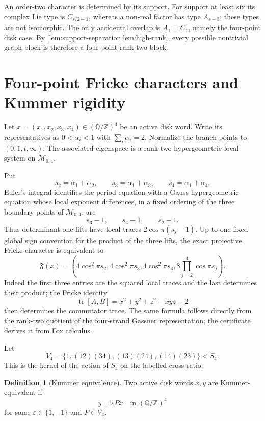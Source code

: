 \documentclass[11pt]{article}
\theoremstyle{definition}
\newtheorem{definition}[theorem]{Definition}
\theoremstyle{remark}
\newcommand{\Q}{\mathbb Q}
\newcommand{\Z}{\mathbb Z}
\newcommand{\M}{\mathcal M}
\begin{document}
An order-two character is determined by its support.  For support at least six its complex Lie type is $C_{s/2-1}$, whereas a non-real factor has type $A_{s-3}$; these types are not isomorphic.  The only accidental overlap is $A_1=C_1$, namely the four-point disk case.  By \cref{lem:support-separation,lem:high-rank}, every possible nontrivial graph block is therefore a four-point rank-two block.

\section{Four-point Fricke characters and Kummer rigidity}

Let $x=(x_1,x_2,x_3,x_4)\in(\Q/\Z)^4$ be an active disk word.  Write its representatives as
$0<\alpha_i<1$ with $\sum_i\alpha_i=2$.  Normalize the branch points to
$(0,1,t,\infty)$.  The associated eigenspace is a rank-two hypergeometric local system on $\M_{0,4}$.

Put
\[
 s_2=\alpha_1+\alpha_2,
 \qquad
 s_3=\alpha_1+\alpha_3,
 \qquad
 s_4=\alpha_1+\alpha_4.
\]
Euler's integral identifies the period equation with a Gauss hypergeometric equation whose local exponent differences, in a fixed ordering of the three boundary points of $\M_{0,4}$, are
\[
 s_3-1,\qquad s_4-1,\qquad s_2-1.
\]
Thus determinant-one lifts have local traces $2\cos\pi(s_j-1)$.  Up to one fixed global sign convention for the product of the three lifts, the exact projective Fricke character is equivalent to
\begin{equation}\label{eq:exact-fingerprint}
 \mathfrak F(x)=
 \left(
 4\cos^2\pi s_2,
 4\cos^2\pi s_3,
 4\cos^2\pi s_4,
 8\prod_{j=2}^4\cos\pi s_j
 \right).
\end{equation}
Indeed the first three entries are the squared local traces and the last determines their product; the Fricke identity
\begin{equation}\label{eq:fricke-identity}
 \operatorname{tr}[A,B]=x^2+y^2+z^2-xyz-2
\end{equation}
then determines the commutator trace.  The same formula follows directly from the rank-two quotient of the four-strand Gassner representation; the certificate derives it from Fox calculus.

Let
\[
 V_4=\{1,(12)(34),(13)(24),(14)(23)\}\triangleleft S_4.
\]
This is the kernel of the action of $S_4$ on the labelled cross-ratio.

\begin{definition}[Kummer equivalence]\label{def:kummer}
Two active disk words $x,y$ are Kummer-equivalent if
\begin{equation}\label{eq:kummer-equivalence}
 y=\varepsilon P x
 \quad\text{in }(\Q/\Z)^4
\end{equation}
for some $\varepsilon\in\{1,-1\}$ and $P\in V_4$.
\end{definition}
\end{document}
